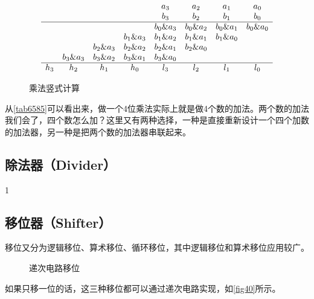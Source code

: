 \begin{figure}[!ht]
$$
\begin{array}{ccccccccc}
&&&&a_3&a_2&a_1&a_0\\
&&&&b_3&b_2&b_1&b_0\\\hline
&&&&b_0\&a_3&b_0\&a_2&b_0\&a_1&b_0\&a_0\\
&&&b_1\&a_3&b_1\&a_2&b_1\&a_1&b_1\&a_0\\
&&b_2\&a_3&b_2\&a_2&b_2\&a_1&b_2\&a_0\\
&b_3\&a_3&b_3\&a_2&b_3\&a_1&b_3\&a_0\\\hline
h_3&h_2&h_1&h_0&l_3&l_2&l_1&l_0
\end{array}
$$
\caption{乘法竖式计算}\label{tab6585}
\end{figure}

从\autoref{tab6585}可以看出来，做一个4位乘法实际上就是做4个数的加法。两个数的加法我们会了，四个数怎么加？这里又有两种选择，一种是直接重新设计一个四个加数的加法器，另一种是把两个数的加法器串联起来。

\subsection{除法器（Divider）}
1
\subsection{移位器（Shifter）}
移位又分为逻辑移位、算术移位、循环移位，其中逻辑移位和算术移位应用较广。

\begin{figure}[!ht]
\centering
{}
\qquad
{}
\qquad
{}
\caption{递次电路移位}\label{fig40}
\end{figure}

如果只移一位的话，这三种移位都可以通过递次电路实现，如\autoref{fig40}所示。

